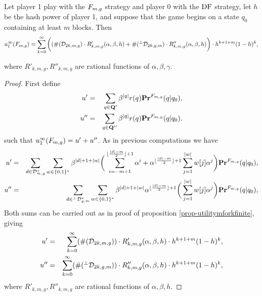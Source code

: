 	\begin{myprop}
	Let player 1 play with the $F_{m,g}$ strategy and player 0 with the $\text{\rm DF}$ strategy, let $h$ be the hash power of player 1, and suppose that the game begins on a state $q_0$ containing at least $m$ blocks. Then
	$$ u_1^\infty(F_{m,g}) =  \sum_{k=0}^{\infty }\bigg((\#(\mathcal{D}_{2k,m,g}) \cdot R'_{k,m,g}(\alpha,\beta,h)+\#({}^\perp\mathcal{D}_{2k,g,m})  \cdot R''_{k,m,g}(\alpha,\beta,h)\bigg)\cdot h^{k+1+m}(1-h)^{k},$$
	\end{myprop}
	where $R'_{k,m,g}, R''_{k,m,g}$ are rational functions of $\alpha,\beta,\gamma$.
 
	\begin{proof}
	First define
		\begin{eqnarray*}
			u' &=& \sum_{q\in\mathbf{Q}'}\beta^{|q|}r(q)\mathbf{Pr}^{F_{m,g}}(q|q_0),\\
			u''&=& \sum_{q\in\mathbf{Q}''}\beta^{|q|}r(q)\mathbf{Pr}^{F_{m,g}}(q|q_0).
		\end{eqnarray*}
		such that $u_1^\infty(F_{m,g})=u'+u''$. As in previous computations we have
		\begin{eqnarray*}
			u' &=& \sum_{d\in \mathcal{D}^{\ast}_{m,g}}\sum_{w\in\{0,1\}^\ast} \beta^{|d|+1+|w|}\bigg(\sum_{i=-m+1}^{\lfloor\frac{|d|-m}{2}\rfloor+1}\alpha^i+\alpha^{\lfloor\frac{|d|-m}{2}\rfloor+1}\sum_{j=1}^{|w|}w[j]\alpha^j\bigg)\mathbf{Pr}^{F_{m,g}}(q|q_0),\\
			u'' &=& \sum_{d\in {}^\perp\mathcal{D}^{\ast}_{g,m}}\sum_{w\in\{0,1\}^\ast} \beta^{|d|+1+|w|}\alpha^{\lfloor\frac{|d|-m}{2}\rfloor+1}\bigg(\sum_{j=1}^{|w|}w[j]\alpha^j\bigg)\mathbf{Pr}^{F_{m,g}}(q|q_0),\\
		\end{eqnarray*}
		Both sums can be carried out as in proof of proposition \ref{prop-utilitymforkfinite}, giving
		\begin{eqnarray*}
			u'  & = & \sum_{k=0}^{\infty}(\#(\mathcal{D}_{2k,m,g}))  \cdot R'_{k,m,g}(\alpha,\beta,h)\cdot h^{k+1+m}(1-h)^{k},\\
			u'' & = & \sum_{k=0}^{\infty}(\#({}^\perp\mathcal{D}_{2k,g,m}))  \cdot R''_{k,m,g}(\alpha,\beta,h)\cdot h^{k+1+m}(1-h)^{k},
		\end{eqnarray*}
	where $R'_{k,m,g},R''_{k,m,g}$ are rational functions of $\alpha,\beta,h$.
	\end{proof}


